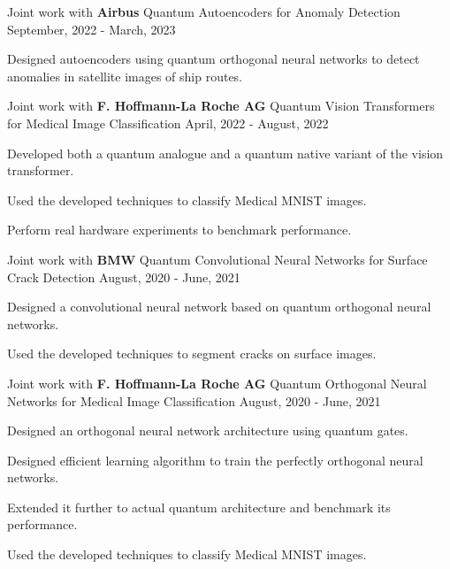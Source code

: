 \begin{cventries}
  \cventry
    {Joint work with \textbf{Airbus}} %
    {Quantum Autoencoders for Anomaly Detection} %
    {} %
    {September, 2022 - March, 2023} %
    {
      \begin{cvitems} %
        \item {Designed autoencoders using quantum orthogonal neural networks to detect anomalies in satellite images of ship routes.}
      \end{cvitems}
    }

  \cventry
    {Joint work with \textbf{F. Hoffmann-La Roche AG}} %
    {Quantum Vision Transformers for Medical Image Classification} %
    {} %
    {April, 2022 - August, 2022} %
    {
      \begin{cvitems} %
        \item {Developed both a quantum analogue and a quantum native variant of the vision transformer.}
        \item {Used the developed techniques to classify Medical MNIST images.}
        \item {Perform real hardware experiments to benchmark performance.}
      \end{cvitems}
    }

  \cventry
    {Joint work with \textbf{BMW}} %
    {Quantum Convolutional Neural Networks for Surface Crack Detection} %
    {} %
    {August, 2020 - June, 2021} %
    {
      \begin{cvitems} %
        \item {Designed a convolutional neural network based on quantum orthogonal neural networks.}
        \item {Used the developed techniques to segment cracks on surface images.}
      \end{cvitems}
    }

  \cventry
    {Joint work with \textbf{F. Hoffmann-La Roche AG}} %
    {Quantum Orthogonal Neural Networks for Medical Image Classification} %
    {} %
    {August, 2020 - June, 2021} %
    {
      \begin{cvitems} %
        \item {Designed an orthogonal neural network architecture using quantum gates.}
        \item {Designed efficient learning algorithm to train the perfectly orthogonal neural networks.}
        \item {Extended it further to actual quantum architecture and benchmark its performance.}
        \item {Used the developed techniques to classify Medical MNIST images.}
      \end{cvitems}
    }



\end{cventries}

